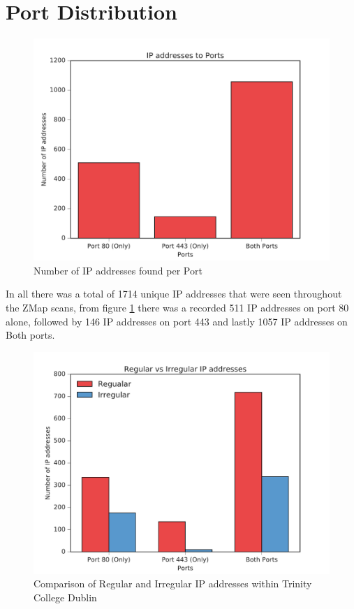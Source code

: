 \documentclass[a4wide,leqno,12pt]{report}
\begin{document}
\section{Port Distribution}
\begin{figure}[H]
\centering
\includegraphics[scale=.5]{pdf_images/IPaddressestoPorts}
\caption{Number of IP addresses found per Port}
\label{fig:ports}
\end{figure}
In all there was a total of 1714 unique IP addresses that were seen throughout the ZMap scans, from figure \ref{fig:ports} there was a recorded 511 IP addresses on port 80 alone, followed by 146 IP addresses on port 443 and lastly 1057 IP addresses on Both ports.

\begin{figure}[H]
\centering
\includegraphics[scale=.5]{pdf_images/RegularVsIrregularIPaddresses}
\caption{Comparison of Regular and Irregular IP addresses within Trinity College Dublin}
\label{fig:portsIrreg}
\end{figure}
\end{document}
